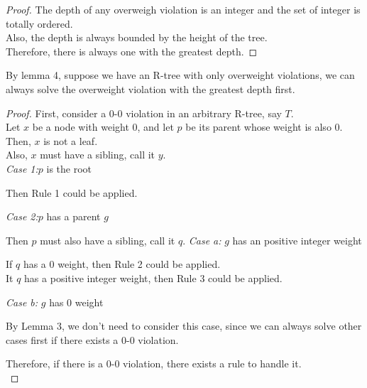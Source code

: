 \documentclass[10pt]{article}
\begin{document}
\begin{enumerate}
	\begin{proof}
		The depth of any overweigh violation is an integer and the set of
		integer is totally ordered. \\
		Also, the depth is always bounded by the height of the tree. \\
		Therefore, there is always one with the greatest depth. 
	\end{proof}

	By lemma 4, suppose we have an R-tree with only overweight violations, we
	can always solve the overweight violation with the greatest depth first. \\

	\begin{proof}
	First, consider a 0-0 violation in an arbitrary R-tree, say $T$. \\
	Let $x$ be a node with weight 0, and let $p$ be its parent whose weight is also 0. \\
	Then, $x$ is not a leaf. \\
	Also, $x$ must have a sibling, call it $y$. \\
	\textit{Case 1:}$p$ is the root
	\begin{addmargin}[1em]{0em}
		Then Rule 1 could be applied.
	\end{addmargin}
	\textit{Case 2:}$p$ has a parent $g$
	\begin{addmargin}[1em]{0em}
		Then $p$ must also have a sibling, call it $q$. 
		\textit{Case a:} $g$ has an positive integer weight
		\begin{addmargin}[1em]{0em}
			If $q$ has a 0 weight, then Rule 2 could be applied. \\
			It $q$ has a positive integer weight, then Rule 3 could be applied.
		\end{addmargin}
		\textit{Case b:} $g$ has 0 weight
		\begin{addmargin}[1em]{0em}
			By Lemma 3, we don't need to consider this case, since we can
			always solve other cases first if there exists a 0-0 violation.
		\end{addmargin}
	\end{addmargin}
	Therefore, if there is a 0-0 violation, there exists a rule to handle it.\\


\end{proof}
\end{enumerate}
\end{document}
